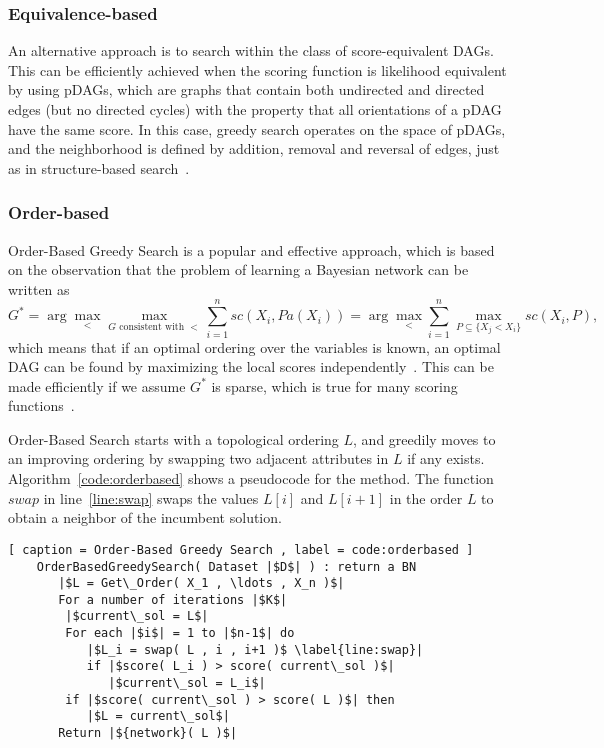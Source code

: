 \subsubsection{Equivalence-based}
\label{subsub:equivalencebased}
An alternative approach is to search within the class of score-equivalent DAGs. This can be efficiently achieved when the scoring function is likelihood equivalent by using pDAGs, which are graphs that contain both undirected and directed edges (but no directed cycles) with the property that all orientations of a pDAG have the same score. In this case, greedy search operates on the space of pDAGs, and the neighborhood is defined by addition, removal and reversal of edges, just as in structure-based search~\cite{Maxwell96,Maxwell02}.

\subsubsection{Order-based}
\label{subsub:orderbased}
Order-Based Greedy Search is a popular and effective approach, which is based on the observation that the problem of learning a Bayesian network can be written as
	\begin{equation}
		\label{eq:orderreduced}
		G^* = \arg \max_{<} \max_{G \text{ consistent with } <} \sum_{i=1}^{n} {sc}( X_i , {Pa}( X_i ) ) = \arg \max_{<} \sum_{i=1}^{n} \max_{P \subseteq \{ X_j < X_i \}} {sc}( X_i , P ) ,
	\end{equation}
which means that if an optimal ordering over the variables is known, an optimal DAG can be found by maximizing the local scores independently~\cite{BD95,FNP99,TK05}. This can be made efficiently if we assume $G^*$ is sparse, which is true for many scoring functions~\cite{Cassio11}.

Order-Based Search starts with a topological ordering $L$, and greedily moves to an improving ordering by swapping two adjacent attributes in $L$ if any exists. Algorithm~\ref{code:orderbased} shows a pseudocode for the method. The function ${swap}$ in line~\ref{line:swap} swaps the values $L[ i ]$ and $L[ i + 1 ]$ in the order $L$ to obtain a neighbor of the incumbent solution.

\begin{lstlisting}[ caption = Order-Based Greedy Search , label = code:orderbased ]
	OrderBasedGreedySearch( Dataset |$D$| ) : return a BN
	   |$L = Get\_Order( X_1 , \ldots , X_n )$|
	   For a number of iterations |$K$|
		|$current\_sol = L$|
		For each |$i$| = 1 to |$n-1$| do
		   |$L_i = swap( L , i , i+1 )$ \label{line:swap}|
		   if |$score( L_i ) > score( current\_sol )$|
		      |$current\_sol = L_i$|
		if |$score( current\_sol ) > score( L )$| then
		   |$L = current\_sol$|
	   Return |${network}( L )$|
\end{lstlisting}

